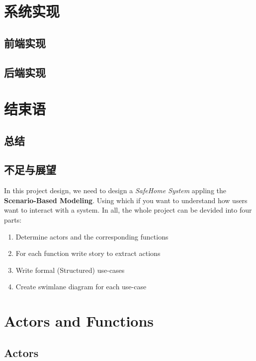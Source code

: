 \documentclass[twoside,11pt]{article}
\begin{document}
\section{系统实现}
\subsection{前端实现}
\subsection{后端实现}



\section{结束语}
\subsection{总结}
\subsection{不足与展望}




In this project design, we need to design a \emph{SafeHome System} appling the \textbf{Scenario-Based Modeling}. Using which if you want to understand how users want to interact with a system\cite{roger2015software}. In all, the whole project can be devided into four parts:
\begin{enumerate}
    \item Determine actors and the corresponding functions
    \item For each function write story to extract actions
    \item Write formal (Structured) use-cases
    \item Create swimlane diagram for each use-case
\end{enumerate}

\section{Actors and Functions}

\subsection{Actors}
\end{document}
